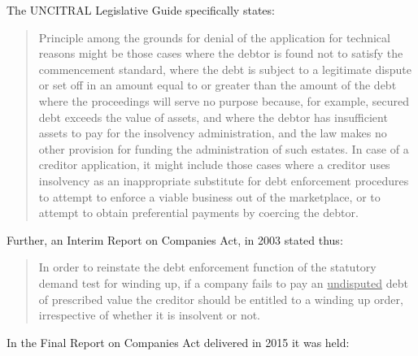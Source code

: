 \documentclass[12pt]{article}
\begin{document}
\noindent The UNCITRAL Legislative Guide specifically states:

\begin{quote}
Principle among the grounds for denial of the application for technical reasons might be those cases where the debtor is found not to satisfy the commencement standard, where the debt is subject to a legitimate dispute or set off in an amount equal to or greater than the amount of the debt where the proceedings will serve no purpose because, for example, secured debt exceeds the value of assets, and where the debtor has insufficient assets to pay for the insolvency administration, and the law makes no other provision for funding the administration of such estates. In case of a creditor application, it might include those cases where a creditor uses insolvency as an inappropriate substitute for debt enforcement procedures to attempt to enforce a viable business out of the marketplace, or to attempt to obtain preferential payments by coercing the debtor. 
\end{quote}


\noindent Further, an Interim Report on Companies Act, in 2003 stated thus:

\begin{quote}
In order to reinstate the debt enforcement function of the statutory demand test for winding up, if a company fails to pay an \uline{undisputed} debt of prescribed value the creditor should be entitled to a winding up order, irrespective of whether it is insolvent or not. 
\end{quote}


\noindent In the Final Report on Companies Act delivered in 2015 it was held:
\end{document}
